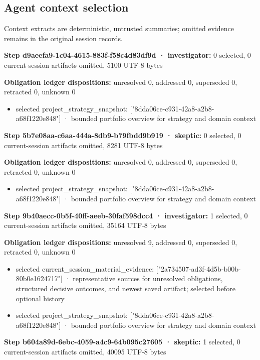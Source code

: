 \documentclass[11pt]{article}
\begin{document}
\subsection{Agent context selection}
Context extracts are deterministic, untrusted summaries; omitted evidence remains in the original session records.\par
\textbf{Step d9aeefa9-1c04-4615-883f-f58c4d83df9d · investigator:} 0 selected, 0 current-session artifacts omitted, 5100 UTF-8 bytes\par
\textbf{Obligation ledger dispositions:} unresolved 0, addressed 0, superseded 0, retracted 0, unknown 0\par
\begin{itemize}
\item selected project\_strategy\_snapshot: ["8dda06ce-c931-42a8-a2b8-a68f1220e848"] · bounded portfolio overview for strategy and domain context
\end{itemize}
\textbf{Step 5b7e08aa-c6aa-444a-8db9-b79fbdd9b919 · skeptic:} 0 selected, 0 current-session artifacts omitted, 8281 UTF-8 bytes\par
\textbf{Obligation ledger dispositions:} unresolved 0, addressed 0, superseded 0, retracted 0, unknown 0\par
\begin{itemize}
\item selected project\_strategy\_snapshot: ["8dda06ce-c931-42a8-a2b8-a68f1220e848"] · bounded portfolio overview for strategy and domain context
\end{itemize}
\textbf{Step 9b40aecc-0b5f-40ff-aeeb-30faf598dcc4 · investigator:} 1 selected, 0 current-session artifacts omitted, 35164 UTF-8 bytes\par
\textbf{Obligation ledger dispositions:} unresolved 9, addressed 0, superseded 0, retracted 0, unknown 0\par
\begin{itemize}
\item selected current\_session\_material\_evidence: ["2a734507-ad3f-4d5b-b00b-80b0e1624717"] · representative sources for unresolved obligations, structured decisive outcomes, and newest saved artifact; selected before optional history
\item selected project\_strategy\_snapshot: ["8dda06ce-c931-42a8-a2b8-a68f1220e848"] · bounded portfolio overview for strategy and domain context
\end{itemize}
\textbf{Step b604a89d-6ebc-4059-a4c9-64b095c27605 · skeptic:} 1 selected, 0 current-session artifacts omitted, 40095 UTF-8 bytes\par
\end{document}
